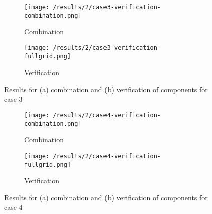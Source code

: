 \begin{figure}[h]
	\centering
    \begin{subfigure}[b]{0.49\textwidth}
	    \texttt{[image: /results/2/case3-verification-combination.png]}
		\centering
        \label{fig:results2case3Combi}
        \caption{Combination}
    \end{subfigure} 
    \begin{subfigure}[b]{0.49\textwidth}    
	    \texttt{[image: /results/2/case3-verification-fullgrid.png]}
		\centering    
	 \caption{Verification}
	    \label{fig:results2case3Full}	 	 
    \end{subfigure} 
    \caption{Results for (a) combination and (b) verification of components for case 3}
    \label{fig:results2case3}
\end{figure}
\begin{figure}[h!]
	\centering
    \begin{subfigure}[b]{0.49\textwidth}
	    \texttt{[image: /results/2/case4-verification-combination.png]}
		\centering
        \label{fig:results2case4Combi}
        \caption{Combination}
    \end{subfigure} 
    \begin{subfigure}[b]{0.49\textwidth}    
	    \texttt{[image: /results/2/case4-verification-fullgrid.png]}
		\centering    
	 \caption{Verification}
	    \label{fig:results2case4Full}	 	 
    \end{subfigure} 
    \caption{Results for (a) combination and (b) verification of components for case 4}
    \label{fig:results2case4}
\end{figure}

